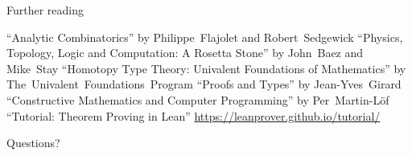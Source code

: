 \documentclass[pdf]{beamer}
\begin{document}
\begin{frame}{Further reading}
  \small
  \begin{outline}
    \1 ``Analytic Combinatorics'' by \mbox{Philippe Flajolet} and \mbox{Robert Sedgewick}
    \1 ``Physics, Topology, Logic and Computation: A Rosetta Stone'' by \mbox{John Baez} and \mbox{Mike Stay}
    \1 ``Homotopy Type Theory: Univalent Foundations of Mathematics'' by \mbox{The Univalent Foundations Program}
    \1 ``Proofs and Types'' by \mbox{Jean-Yves Girard}
    \1 ``Constructive Mathematics and Computer Programming'' by \mbox{Per Martin-L\"{o}f}
    \1 ``Tutorial: Theorem Proving in Lean'' \href{url}{https://leanprover.github.io/tutorial/}
  \end{outline}
\end{frame}

\begin{frame}{Questions?}
\end{frame}
\end{document}
